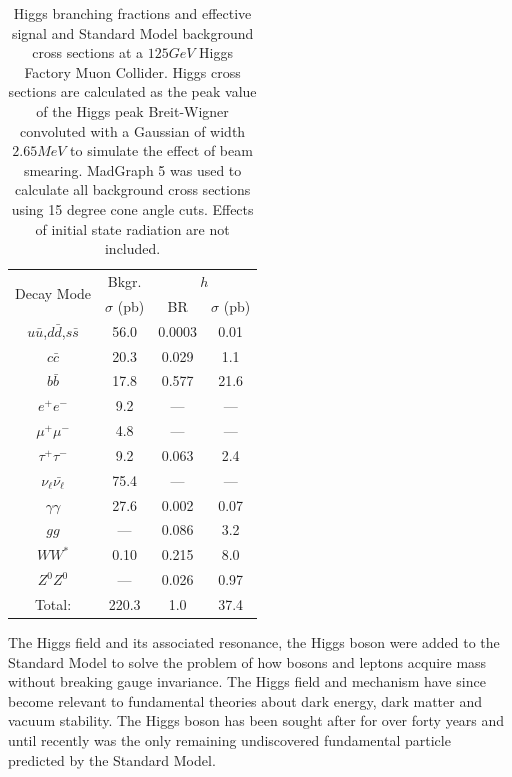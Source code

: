 \documentclass[a4paper]{article}
\begin{document}
\begin{table}
	\begin{center}
		\begin{tabular}{|c|c|c|c|}
			\hline
			\multirow{2}{*}{Decay Mode} & Bkgr. & \multicolumn{2}{|c|}{$h$} \\ \cline{2-4}
			 & $\sigma$ (pb) & BR & $\sigma$ (pb) \\ 
			\hline
			$u\bar{u}$,$d\bar{d}$,$s\bar{s}$ & 56.0 & 0.0003 & 0.01 \\ \hline
			$c\bar{c}$      & 20.3 & 0.029 & 1.1 \\ \hline
			$b\bar{b}$      & 17.8 & 0.577 & 21.6 \\ \hline
			$e^+e^-$        & 9.2 & --- & --- \\ \hline
			$\mu^+\mu^-$    & 4.8 & --- & --- \\ \hline
			$\tau^+\tau^-$  & 9.2 & 0.063 & 2.4 \\ \hline
			$\nu_{\ell}\bar{\nu_{\ell}}$    & 75.4  & --- & --- \\ \hline
			$\gamma\gamma$  & 27.6   & 0.002 & 0.07 \\ \hline
			$gg$                    & ---   & 0.086 & 3.2 \\ \hline
			$WW^*$                  & 0.10   & 0.215 & 8.0 \\ \hline
			$Z^0Z^0$                & ---   & 0.026 & 0.97 \\
			\hline \hline
			Total:  & 220.3 & 1.0 & 37.4 \\ \hline
		\end{tabular}
	\end{center}
	\caption{Higgs branching fractions and effective signal and Standard Model background cross sections at a $125GeV$ Higgs Factory Muon Collider. Higgs cross sections are calculated as the peak value of the Higgs peak Breit-Wigner convoluted with a Gaussian of width $2.65 MeV$ to simulate the effect of beam smearing. MadGraph 5 was used to calculate all background cross sections using 15 degree cone angle cuts. Effects of initial state radiation are not included.\label{bfs-xsects2}}
\end{table}

The Higgs field and its associated resonance, the Higgs boson were added to the Standard Model to solve the problem of how bosons and leptons acquire mass without breaking gauge invariance. The Higgs field and mechanism have since become relevant to fundamental theories about dark energy, dark matter and vacuum stability. The Higgs boson has been sought after for over forty years and until recently was the only remaining undiscovered fundamental particle predicted by the Standard Model.
\end{document}
